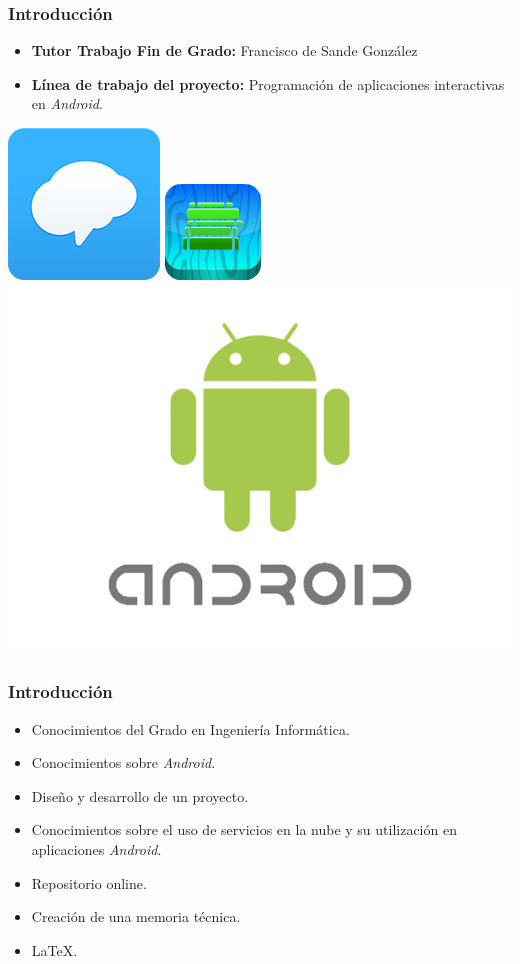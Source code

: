 \begin{frame}
    \frametitle{Introducción}
    \begin{itemize}
	\item \textbf{Tutor Trabajo Fin de Grado:} Francisco de Sande González
        \item \textbf{Línea de trabajo del proyecto:} Programación de aplicaciones interactivas en {\it Android}.
    \end{itemize}
        {\inserttitlegraphic\par}
		\vfill \includegraphics[width=0.2\linewidth]{Images/logos/remind_logo_2}
		\hfill %
		\includegraphics[width=0.2\linewidth]{Images/logos/schoolApp}
		\hfill \includegraphics[width=0.35\linewidth]{Images/logos/android_logo}
\end{frame}
\begin{frame}
	\frametitle{Introducción}
		\begin{itemize}
			\item Conocimientos del Grado en Ingeniería Informática.
			\item Conocimientos sobre {\it Android}.
			\item Diseño y desarrollo de un proyecto.
			\item Conocimientos sobre el uso de servicios en la nube y su utilización en aplicaciones {\it Android}.
			\item Repositorio online.
			\item Creación de una memoria técnica.
			\item \LaTeX{}.
		\end{itemize}
	\endblock{}
\end{frame}
